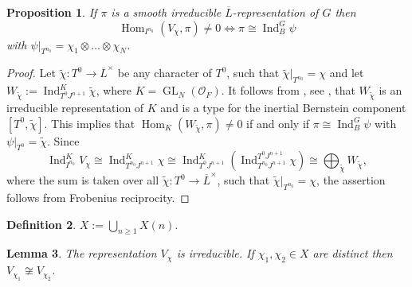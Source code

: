\documentclass[11pt]{article}
\let\mathcal\mathscr
\newtheorem{prop}{Proposition}[section]
\newtheorem{lem}[prop]{Lemma}
\theoremstyle{definition}
\newtheorem{defi}[prop]{Definition}
\DeclareMathOperator{\Hom}{Hom}
\DeclareMathOperator{\Ind}{Ind}
\DeclareMathOperator{\GL}{GL}
\newcommand{\Indu}[3]{\Ind_{#1}^{#2}{#3}}
\newcommand{\cO}{\mathcal{O}}
\newcommand{\Lbar}{\overline{L}}
\begin{document}
\begin{prop}\label{types_prince} If $\pi$ is a smooth irreducible $\Lbar$-representation of $G$ then
\[
\Hom_{I^{n_0}}( V_{\chi}, \pi)\neq 0 \iff\pi\cong \Indu{B}{G}{\psi}
\]
with $\psi|_{T^{n_0}}= \chi_1\otimes\ldots\otimes \chi_N$.
\end{prop}

\begin{proof} Let $\tilde{\chi}: T^0\to \Lbar^{\times}$ be any character of $T^0$, such that $\tilde{\chi}|_{T^{n_0}}=\chi$ and let $W_{\tilde{\chi}}:=\Indu{T^0 J^{n+1}}{K}{\tilde{\chi}}$,
where $K=\GL_N(\cO_F)$. It follows from \cite{BK_cover}, see \cite[Prop.\,3.10]{HS}, that $W_{\tilde{\chi}}$ is an irreducible representation of $K$ and is a type for the inertial Bernstein
component $[T^0, \tilde{\chi}]$. This implies that $\Hom_{K}(W_{\tilde{\chi}}, \pi)\neq 0$ if and only if $\pi\cong \Indu{B}{G}{\psi}$ with $\psi|_{T^{0}}= \tilde{\chi}$. Since
\begin{equation}\label{induce_up}
\Indu{I^{n_0}}{K}{V_\chi}\cong \Indu{T^{n_0} J^{n+1}}{K}{\chi}\cong \Indu{T^0J^{n+1}}{K}{(\Indu{T^{n_0} J^{n+1}}{T^0 J^{n+1}}{\chi})}\cong \bigoplus_{\tilde{\chi}} W_{\tilde{\chi}},
\end{equation}
where the sum is taken over all $\tilde{\chi}: T^0\to \Lbar^{\times}$, such that $\tilde{\chi}|_{T^{n_0}}= \chi$, the assertion follows from Frobenius reciprocity.
\end{proof}

\begin{defi} $X:= \bigcup_{n\ge 1} X(n)$.
\end{defi}

\begin{lem}\label{irreducible_distinct} The representation $V_{\chi}$ is irreducible. If $\chi_1, \chi_2\in X$ are distinct then $V_{\chi_1}\not \cong V_{\chi_2}$.
\end{lem}
\end{document}
